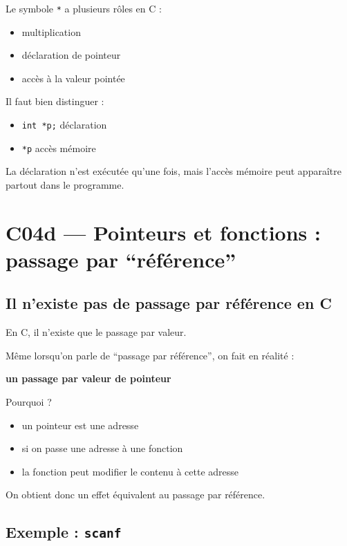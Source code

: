 Le symbole \texttt{*} a plusieurs rôles en C :

\begin{itemize}
    \item multiplication
    \item déclaration de pointeur
    \item accès à la valeur pointée
\end{itemize}

Il faut bien distinguer :

\begin{itemize}
    \item \texttt{int *p;} \hspace{1em} déclaration
    \item \texttt{*p} \hspace{2.2em} accès mémoire
\end{itemize}

La déclaration n’est exécutée qu’une fois,
mais l’accès mémoire peut apparaître partout dans le programme.

\section{C04d — Pointeurs et fonctions : passage par ``référence''}

\subsection{Il n’existe pas de passage par référence en C}

En C, il n’existe que le passage par valeur.

Même lorsqu’on parle de ``passage par référence'',
on fait en réalité :

\begin{center}
\textbf{un passage par valeur de pointeur}
\end{center}

Pourquoi ?

\begin{itemize}
    \item un pointeur est une adresse
    \item si on passe une adresse à une fonction
    \item la fonction peut modifier le contenu à cette adresse
\end{itemize}

On obtient donc un effet équivalent au passage par référence.

\subsection{Exemple : \texttt{scanf}}


